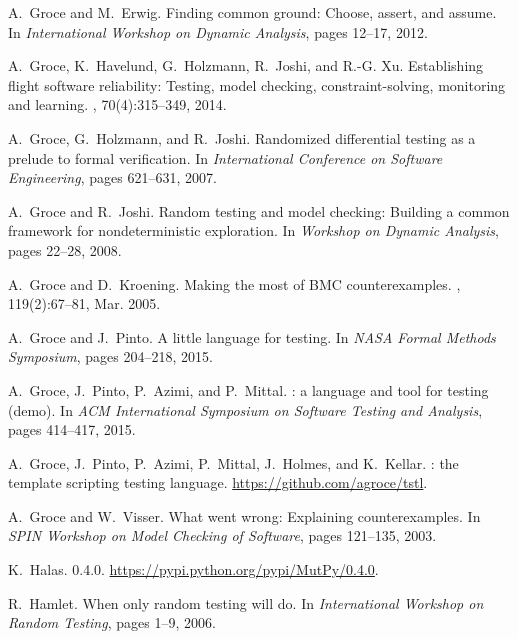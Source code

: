 \documentclass[sigconf]{acmart}
\begin{document}
\begin{thebibliography}{10}
A.~Groce and M.~Erwig.
\newblock Finding common ground: Choose, assert, and assume.
\newblock In {\em International Workshop on Dynamic Analysis}, pages 12--17,
  2012.

A.~Groce, K.~Havelund, G.~Holzmann, R.~Joshi, and R.-G. Xu.
\newblock Establishing flight software reliability: Testing, model checking,
  constraint-solving, monitoring and learning.
,
  70(4):315--349, 2014.

A.~Groce, G.~Holzmann, and R.~Joshi.
\newblock Randomized differential testing as a prelude to formal verification.
\newblock In {\em International Conference on Software Engineering}, pages
  621--631, 2007.

\vspace{4in}

A.~Groce and R.~Joshi.
\newblock Random testing and model checking: Building a common framework for
  nondeterministic exploration.
\newblock In {\em Workshop on Dynamic Analysis}, pages 22--28, 2008.

A.~Groce and D.~Kroening.
\newblock Making the most of {BMC} counterexamples.
, 119(2):67--81, Mar. 2005.

A.~Groce and J.~Pinto.
\newblock A little language for testing.
\newblock In {\em NASA Formal Methods Symposium}, pages 204--218, 2015.

A.~Groce, J.~Pinto, P.~Azimi, and P.~Mittal.
: a language and tool for testing (demo).
\newblock In {\em ACM International Symposium on Software Testing and
  Analysis}, pages 414--417, 2015.

A.~Groce, J.~Pinto, P.~Azimi, P.~Mittal, J.~Holmes, and K.~Kellar.
: the template scripting testing language.
\newblock \url{https://github.com/agroce/tstl}.

A.~Groce and W.~Visser.
\newblock What went wrong: Explaining counterexamples.
\newblock In {\em SPIN Workshop on Model Checking of Software}, pages 121--135,
  2003.

K.~Halas.
 0.4.0.
\newblock \url{https://pypi.python.org/pypi/MutPy/0.4.0}.

R.~Hamlet.
\newblock When only random testing will do.
\newblock In {\em International Workshop on Random Testing}, pages 1--9, 2006.


\end{thebibliography}
\end{document}
